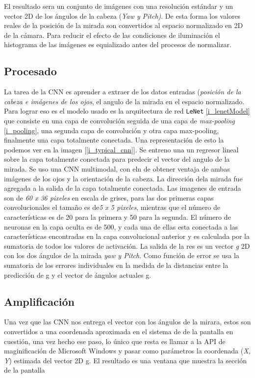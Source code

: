 \documentclass[12pt]{book} %
\begin{document}
		El resultado sera un conjunto de imágenes con una resolución estándar y un vector 2D de los ángulos de la cabeza (\textit{Yaw y Pitch)}.
		De esta forma los valores reales de la posición de la mirada son convertidos al espacio normalizado en 2D de la cámara.
		Para reducir el efecto de las condiciones de iluminación el histograma de las imágenes es equializado antes del procesos de normalizar.
		
	\subsection{Procesado}
		La tarea de la CNN es aprender a extraer de los datos entradas (\textit{posición de la cabeza e imágenes de los ojos}, el angulo de la
		mirada en el espacio normalizado.
		Para lograr eso es el modelo usado es la arquitectura de red \texttt{LeNet} \ref{i_lenetModel} que consiste en una capa de convolución 
		seguida de una capa 	de \textit{max-pooling} \ref{i_pooling}, una segunda capa de convolución y otra capa max-pooling, finalmente una 
		capa totalmente conectada.
		Una representación de esto la podemos ver en la imagen [\ref{i_typical_cnn}].
		Se entreno una un regresor lineal sobre la capa totalmente conectada para predecir el vector del angulo de la mirada. Se uso una 
		CNN multimodal, con eln de obtener ventaja de ambas imágenes de los ojos y la orientación de la cabeza.
		La dirección dela mirada fue agregada a la salida de la capa totalmente conectada.
		Las imagenes de entrada son de \textit{60 x 36 pixeles} en escala de grises, para las dos primeras capas convolucionales el tamaño
		es de\textit{5 x 5 pixeles}, mientras que el número de características es de 20 para la primera y 50 para la segunda. El número de 
		neuronas en la capa oculta es de 500, y cada una de ellas esta conectada a las características encontradas en la capa convolucional 
		anterior y es calculada por la sumatoria de todos los valores de activación. La salida de la res es un vector \textit{g} 2D 
		con los dos ángulos de la mirada \textit{yaw y Pitch}. Como función de error se usa la sumatoria de los errores individuales en la
		medida de la distancias entre la predicción de g y el vector de ángulos actuales g.
		
	\subsection{Amplificación}
		Una 	vez que las CNN nos entrega el vector con los ángulos de la mirara, estos son convertidos a una coordenada aproximada en 
		el sistema de de la pantalla en cuestión, una vez hecho ese paso, lo único que resta es llamar a la API de maginificación de 
		Microsoft Windows y pasar como parámetros la coordenada (\textit{X, Y}) estimada del vector 2D g.
		El resultado es una ventana que muestra la sección de la pantalla
	
\end{document}
